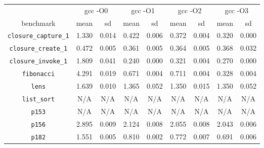 \documentclass[12pt,a4paper,twoside,openright]{report}
\begin{document}
\begin{table}[h]
\begin{tabular}{| c | c c | c c | c c | c c |}
  \hline
  & \multicolumn{2}{c|}{gcc -O0}
  & \multicolumn{2}{c|}{gcc -O1}
  & \multicolumn{2}{c|}{gcc -O2}
  & \multicolumn{2}{c|}{gcc -O3}
  \\
benchmark                     & mean  & sd    & mean  & sd    & mean  & sd    & mean  & sd    \\
  \hline
\lstinline!closure_capture_1! & \cellcolor[hsb]{0.3,0.266,1}1.330 & 0.014 & \cellcolor[hsb]{0.3,0.767,1}0.422 & 0.006 & \cellcolor[hsb]{0.3,0.795,1}0.372 & 0.004 & \cellcolor[hsb]{0.3,0.823,1}0.320 & 0.000 \\
\lstinline!closure_create_1!  & \cellcolor[hsb]{0.0,0.975,1}0.472 & 0.005 & \cellcolor[hsb]{0.0,0.628,1}0.361 & 0.005 & \cellcolor[hsb]{0.0,0.635,1}0.364 & 0.005 & \cellcolor[hsb]{0.0,0.648,1}0.368 & 0.032 \\
\lstinline!closure_invoke_1!  & \cellcolor[hsb]{0.3,0.175,1}1.809 & 0.041 & \cellcolor[hsb]{0.3,0.890,1}0.240 & 0.000 & \cellcolor[hsb]{0.3,0.854,1}0.321 & 0.004 & \cellcolor[hsb]{0.3,0.877,1}0.270 & 0.000 \\
\lstinline!fibonacci!         & \cellcolor[hsb]{0.0,0.178,1}4.291 & 0.019 & \cellcolor[hsb]{0.3,0.788,1}0.671 & 0.004 & \cellcolor[hsb]{0.3,0.775,1}0.711 & 0.004 & \cellcolor[hsb]{0.3,0.896,1}0.328 & 0.004 \\
\lstinline!lens!              & \cellcolor[hsb]{0.0,1.000,1}1.639 & 0.010 & \cellcolor[hsb]{0.0,1.000,1}1.365 & 0.052 & \cellcolor[hsb]{0.0,1.000,1}1.350 & 0.015 & \cellcolor[hsb]{0.0,1.000,1}1.350 & 0.052 \\
\lstinline!list_sort!         &                                N/A &    N/A &                                N/A &    N/A &                                N/A &    N/A &                                N/A &    N/A \\
\lstinline!p153!              &                                N/A &    N/A &                                N/A &    N/A &                                N/A &    N/A &                                N/A &    N/A \\
\lstinline!p156!              & \cellcolor[hsb]{0.0,0.913,1}2.895 & 0.009 & \cellcolor[hsb]{0.0,0.536,1}2.124 & 0.008 & \cellcolor[hsb]{0.0,0.503,1}2.055 & 0.008 & \cellcolor[hsb]{0.0,0.497,1}2.043 & 0.006 \\
\lstinline!p182!              & \cellcolor[hsb]{0.0,0.198,1}1.551 & 0.005 & \cellcolor[hsb]{0.3,0.271,1}0.810 & 0.002 & \cellcolor[hsb]{0.3,0.305,1}0.772 & 0.007 & \cellcolor[hsb]{0.3,0.378,1}0.691 & 0.006 \\

\end{tabular}
\end{table}
\end{document}
